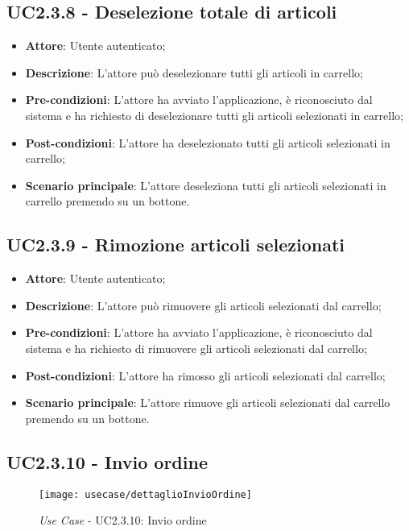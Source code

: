 \subsection{UC2.3.8 - Deselezione totale di articoli}

\begin{itemize}
	\item \textbf{Attore}: Utente autenticato;
	\item \textbf{Descrizione}: L'attore può deselezionare tutti gli articoli in carrello;
	\item \textbf{Pre-condizioni}: L'attore ha avviato l'applicazione, è riconosciuto dal sistema e ha richiesto di deselezionare tutti gli articoli selezionati in carrello;
	\item \textbf{Post-condizioni}: L'attore ha deselezionato tutti gli articoli selezionati in carrello;
	\item \textbf{Scenario principale}: L'attore deseleziona tutti gli articoli selezionati in carrello premendo su un bottone.
\end{itemize}

\subsection{UC2.3.9 - Rimozione articoli selezionati}

\begin{itemize}
	\item \textbf{Attore}: Utente autenticato;
	\item \textbf{Descrizione}: L'attore può rimuovere gli articoli selezionati dal carrello;
	\item \textbf{Pre-condizioni}: L'attore ha avviato l'applicazione, è riconosciuto dal sistema e ha richiesto di rimuovere gli articoli selezionati dal carrello;
	\item \textbf{Post-condizioni}: L'attore ha rimosso gli articoli selezionati dal carrello;
	\item \textbf{Scenario principale}: L'attore rimuove gli articoli selezionati dal carrello premendo su un bottone.
\end{itemize}

\newpage

\subsection{UC2.3.10 - Invio ordine}

\begin{figure}[!h] 
    \centering 
    \texttt{[image: usecase/dettaglioInvioOrdine]} 
    \caption{\textit{Use Case} - UC2.3.10: Invio ordine}
\end{figure}

